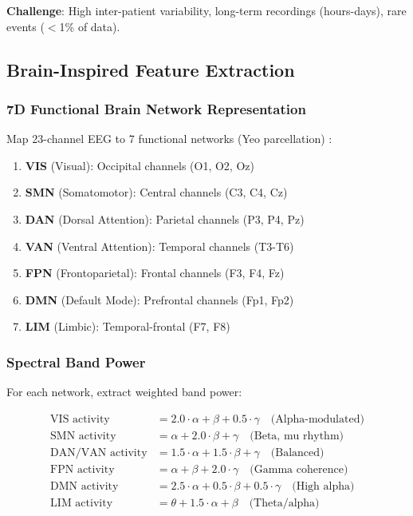 \documentclass[11pt]{article}
\theoremstyle{remark}
\begin{document}
\textbf{Challenge}: High inter-patient variability, long-term recordings (hours-days), rare events ($<$1\% of data).

\subsection{Brain-Inspired Feature Extraction}

\subsubsection{7D Functional Brain Network Representation}

Map 23-channel EEG to 7 functional networks (Yeo parcellation) \cite{yeo2011}:

\begin{enumerate}
\item \textbf{VIS} (Visual): Occipital channels (O1, O2, Oz)
\item \textbf{SMN} (Somatomotor): Central channels (C3, C4, Cz)
\item \textbf{DAN} (Dorsal Attention): Parietal channels (P3, P4, Pz)
\item \textbf{VAN} (Ventral Attention): Temporal channels (T3-T6)
\item \textbf{FPN} (Frontoparietal): Frontal channels (F3, F4, Fz)
\item \textbf{DMN} (Default Mode): Prefrontal channels (Fp1, Fp2)
\item \textbf{LIM} (Limbic): Temporal-frontal (F7, F8)
\end{enumerate}

\subsubsection{Spectral Band Power}

For each network, extract weighted band power:

\begin{align}
\text{VIS activity} &= 2.0 \cdot \alpha + \beta + 0.5 \cdot \gamma \quad \text{(Alpha-modulated)} \\
\text{SMN activity} &= \alpha + 2.0 \cdot \beta + \gamma \quad \text{(Beta, mu rhythm)} \\
\text{DAN/VAN activity} &= 1.5 \cdot \alpha + 1.5 \cdot \beta + \gamma \quad \text{(Balanced)} \\
\text{FPN activity} &= \alpha + \beta + 2.0 \cdot \gamma \quad \text{(Gamma coherence)} \\
\text{DMN activity} &= 2.5 \cdot \alpha + 0.5 \cdot \beta + 0.5 \cdot \gamma \quad \text{(High alpha)} \\
\text{LIM activity} &= \theta + 1.5 \cdot \alpha + \beta \quad \text{(Theta/alpha)}
\end{align}
\end{document}
